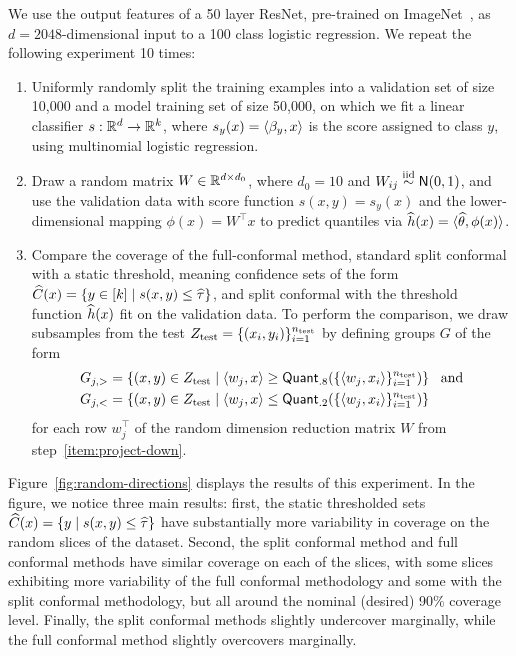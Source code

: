 \documentclass{article}
\newcommand{\scorefunc}{s}
\newcommand{\scoreval}{\scorefunc}
\newcommand{\quant}{\mathsf{Quant}}
\begin{document}
We use the output features of a 50 layer ResNet, pre-trained
on ImageNet~\cite{HeZhReSu16, HeZhReSu16b},
as $d = 2048$-dimensional input to a 100 class
logistic regression.
%
We repeat the following experiment 10 times:
\begin{enumerate}[1.]
\item Uniformly randomly split the training examples into a validation set
  of size 10,000 and a model training set of size 50,000, on which we fit a
  linear classifier $\scorefunc : \R^d \to \R^k$, where $\scorefunc_y(x) =
  \<\beta_y, x\>$ is the score assigned to class $y$, using multinomial
  logistic regression.
\item \label{item:project-down}
  Draw a random matrix $W \in \mathbb{R}^{d \times d_0}$, where
  $d_0 = 10$ and $W_{ij} \stackrel{\rm iid}{\sim} \mathsf{N}(0, 1)$,
  and use the validation data with score function
  $\scorefunc(x, y) = \scorefunc_y(x)$ and the lower-dimensional
  mapping $\phi(x) = W^\top x$
  to predict quantiles via $\widehat{h}(x) = \langle\widehat{\theta}, \phi(x)\rangle$.
\item Compare the coverage of the full-conformal method,
  standard split conformal with a static threshold,
  meaning confidence sets of the form
  $\what{C}(x) = \{y \in [k] \mid \scorefunc(x, y) \le \what{\tau}\}$,
  and split conformal with the threshold function
  $\widehat{h}(x)$ fit on the validation data.
  To perform the comparison, we draw subsamples from the test
  $Z_{\textup{test}} = \{(x_i, y_i)\}_{i = 1}^{n_{\textup{test}}}$
  by defining groups $G$ of the form
  \begin{align*}
    G_{j,>} & = \left\{(x, y) \in Z_{\textup{test}}
    \mid  \<w_j, x\> \ge \quant_{.8}(\{\<w_j, x_i\>\}_{i = 1}^{n_{\textup{test}}})
    \right\} ~~ \mbox{and} \\
    G_{j,<} & = \left\{(x, y) \in Z_{\textup{test}}
    \mid  \<w_j, x\> \le \quant_{.2}(\{\<w_j, x_i\>\}_{i = 1}^{n_{\textup{test}}})
    \right\}
  \end{align*}
  for each row $w_j^\top$ of the random dimension reduction matrix
  $W$ from step~\ref{item:project-down}.
\end{enumerate}

Figure~\ref{fig:random-directions} displays the results of this experiment.
%
In the figure, we notice three main results: first, the static thresholded
sets $\what{C}(x) = \{y \mid \scoreval(x, y) \le \what{\tau}\}$ have
substantially more variability in coverage on the random slices of the
dataset.
%
Second, the split conformal method and full conformal methods have
similar coverage on each of the slices, with some
slices exhibiting more variability of the full conformal methodology
and some with the split conformal methodology, but all
around the nominal (desired) 90\% coverage level.
%
Finally, the split conformal methods slightly undercover marginally,
while the full conformal method slightly overcovers marginally.
\end{document}
